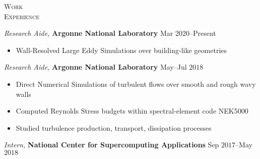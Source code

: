 \documentclass[10pt]{article}
\begin{document}
\begin{multicols}{2}
\textsc{Work \\ Experience}
\columnbreak

\textit{Research Aide,} \textbf{Argonne National Laboratory} \hfill Mar 2020--Present

\vspace{-1.75em}
\begin{itemize}[label=-]
    \setlength\itemsep{-0.25em}
    \setlength{\itemindent}{-1.50em}
    \item Wall-Resolved Large Eddy Simulations over building-like geometries
\end{itemize}
\vspace{-2.0em}

\vspace{0.5em}
%
\textit{Research Aide,} \textbf{Argonne National Laboratory} \hfill May--Jul $2018$

\vspace{-1.75em}
\begin{itemize}[label=-]
    \setlength\itemsep{-0.25em}
    \setlength{\itemindent}{-1.50em}
    \item Direct Numerical Simulations of turbulent flows over smooth and rough wavy walls
    \item Computed Reynolds Stress budgets within spectral-element code {NEK5000}
    \item Studied turbulence production, transport, dissipation processes%
\end{itemize}
\vspace{-2.0em}

\vspace{0.5em}
%
\textit{Intern,} \textbf{National Center for Supercomputing Applications} \hfill Sep $2017$--May $2018$


\end{multicols}
\end{document}
